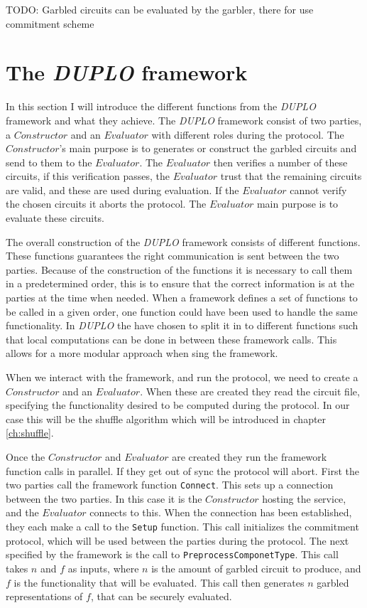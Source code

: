 \documentclass[twoside,11pt,openright]{report}
\newcommand{\todo}[1]{}
\renewcommand{\todo}[1]{{\color{red} TODO: {#1}} \\}
\newcommand{\DUPLO}{\textit{DUPLO} }
\begin{document}
\todo{Garbled circuits can be evaluated by the garbler, there for use commitment scheme}


\section{The \DUPLO framework}
\label{sec:duplo_framework}
In this section I will introduce the different functions from the \DUPLO framework and what they achieve. The \DUPLO framework consist of two parties, a $Constructor$ and an $Evaluator$ with different roles during the protocol. The $Constructor$'s main purpose is to generates or construct the garbled circuits and send to them to the $Evaluator$. The $Evaluator$ then verifies a number of these circuits, if this verification passes, the $Evaluator$ trust that the remaining circuits are valid, and these are used during evaluation. If the $Evaluator$ cannot verify the chosen circuits it aborts the protocol. The $Evaluator$ main purpose is to evaluate these circuits.

The overall construction of the \DUPLO framework consists of different functions. These functions guarantees the right communication is sent between the two parties. Because of the construction of the functions it is necessary to call them in a predetermined order, this is to ensure that the correct information is at the parties at the time when needed. When a framework defines a set of functions to be called in a given order, one function could have been used to handle the same functionality. In \DUPLO the have chosen to split it in to different functions such that local computations can be done in between these framework calls. This allows for a more modular approach when sing the framework.

\bigskip

When we interact with the framework, and run the protocol, we need to create a $Constructor$ and an $Evaluator$. When these are created they read the circuit file, specifying the functionality desired to be computed during the protocol. In our case this will be the shuffle algorithm which will be introduced in chapter \ref{ch:shuffle}.

Once the $Constructor$ and $Evaluator$ are created they run the framework function calls in parallel. If they get out of sync the protocol will abort. First the two parties call the framework function \verb|Connect|. This sets up a connection between the two parties. In this case it is the $Constructor$ hosting the service, and the $Evaluator$ connects to this. When the connection has been established, they each make a call to the \verb|Setup| function. This call initializes the commitment protocol, which will be used between the parties during the protocol. The next specified by the framework is the call to \verb|PreprocessComponetType|. This call takes $n$ and $f$ as inputs, where $n$ is the amount of garbled circuit to produce, and $f$ is the functionality that will be evaluated. This call then generates $n$ garbled representations of $f$, that can be securely evaluated.
\end{document}
